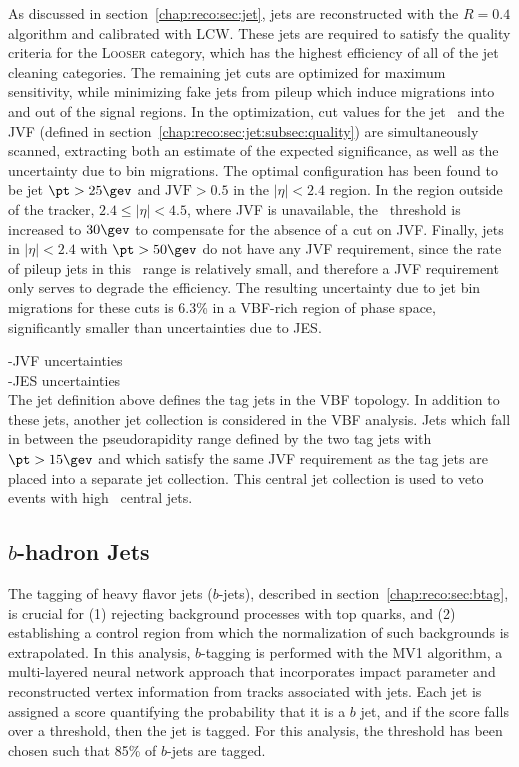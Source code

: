 As discussed in section~\ref{chap:reco:sec:jet}, jets are
reconstructed with the \antikt $R=0.4$ algorithm and calibrated with
LCW. These jets are required to satisfy the quality criteria for the
L\textsc{ooser} category, which has the highest efficiency of all of
the jet cleaning categories. The remaining jet cuts are optimized for
maximum sensitivity, while minimizing fake jets from pileup which
induce migrations into and out of the signal regions. In the
optimization, cut values for the jet \pt~and the JVF (defined in
section~\ref{chap:reco:sec:jet:subsec:quality}) are simultaneously
scanned, extracting both an estimate of the expected significance, as
well as the uncertainty due to bin migrations. The optimal
configuration has been found to be jet $\pt > 25 \gev$ and
$\textrm{JVF} > 0.5$ in the $|\eta| < 2.4$ region. In the region
outside of the tracker, $2.4 \leq |\eta| < 4.5$, where JVF is
unavailable, the \pt~threshold is increased to $30 \gev$ to compensate
for the absence of a cut on JVF. Finally, jets in $|\eta| < 2.4$ with
$\pt > 50 \gev$ do not have any JVF requirement, since the rate of
pileup jets in this \pt~range is relatively small, and therefore a JVF
requirement only serves to degrade the efficiency. The resulting
uncertainty due to jet bin migrations for these cuts is 6.3\% in a
VBF-rich region of phase space, significantly smaller than
uncertainties due to JES. 

\noindent -JVF uncertainties \\
\noindent -JES uncertainties \\

The jet definition above defines the tag jets in the VBF topology. In
addition to these jets, another jet collection is considered in the
VBF analysis. Jets which fall in between the pseudorapidity range
defined by the two tag jets with $\pt > 15 \gev$ and which satisfy the
same JVF requirement as the tag jets are placed into a separate jet
collection. This central jet collection is used to veto events with
high \pt~central jets.

\subsection{$b$-hadron Jets}

The tagging of heavy flavor jets ($b$-jets), described in
section~\ref{chap:reco:sec:btag}, is crucial for (1) rejecting
background processes with top quarks, and (2) establishing a control
region from which the normalization of such backgrounds is
extrapolated. In this analysis, $b$-tagging is performed with the MV1
algorithm, a multi-layered neural network approach that incorporates
impact parameter and reconstructed vertex information from tracks
associated with jets. Each jet is assigned a score quantifying the
probability that it is a $b$ jet, and if the score falls over a
threshold, then the jet is tagged. For this analysis, the threshold
has been chosen such that 85\% of $b$-jets are tagged. 

